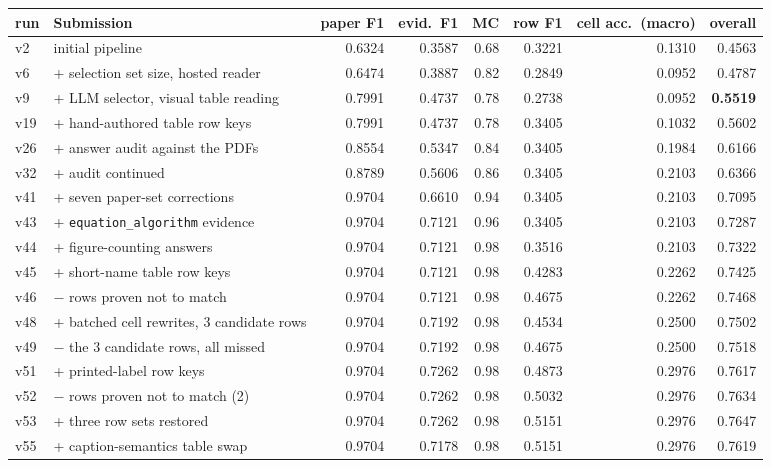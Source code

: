 \documentclass[11pt]{article}
\begin{document}
\begin{table}[t]
\centering\small
\begin{tabular}{llrrrrrr}
\toprule
run & Submission & paper F1 & evid.\ F1 & MC & row F1 & cell acc.\ (macro) & \textbf{overall} \\
\midrule
v2  & initial pipeline                          & 0.6324 & 0.3587 & 0.68 & 0.3221 & 0.1310 & 0.4563 \\
v6  & \;+ selection set size, hosted reader     & 0.6474 & 0.3887 & 0.82 & 0.2849 & 0.0952 & 0.4787 \\
v9  & \;+ LLM selector, visual table reading    & 0.7991 & 0.4737 & 0.78 & 0.2738 & 0.0952 & \textbf{0.5519} \\
v19 & \;+ hand-authored table row keys          & 0.7991 & 0.4737 & 0.78 & 0.3405 & 0.1032 & 0.5602 \\
v26 & \;+ answer audit against the PDFs         & 0.8554 & 0.5347 & 0.84 & 0.3405 & 0.1984 & 0.6166 \\
v32 & \;+ audit continued                       & 0.8789 & 0.5606 & 0.86 & 0.3405 & 0.2103 & 0.6366 \\
v41 & \;+ seven paper-set corrections           & 0.9704 & 0.6610 & 0.94 & 0.3405 & 0.2103 & 0.7095 \\
v43 & \;+ \texttt{equation\_algorithm} evidence & 0.9704 & 0.7121 & 0.96 & 0.3405 & 0.2103 & 0.7287 \\
v44 & \;+ figure-counting answers               & 0.9704 & 0.7121 & 0.98 & 0.3516 & 0.2103 & 0.7322 \\
v45 & \;+ short-name table row keys             & 0.9704 & 0.7121 & 0.98 & 0.4283 & 0.2262 & 0.7425 \\
v46 & \;$-$ rows proven not to match            & 0.9704 & 0.7121 & 0.98 & 0.4675 & 0.2262 & 0.7468 \\
v48 & \;+ batched cell rewrites, 3 candidate rows & 0.9704 & 0.7192 & 0.98 & 0.4534 & 0.2500 & 0.7502 \\
v49 & \;$-$ the 3 candidate rows, all missed    & 0.9704 & 0.7192 & 0.98 & 0.4675 & 0.2500 & 0.7518 \\
v51 & \;+ printed-label row keys                & 0.9704 & 0.7262 & 0.98 & 0.4873 & 0.2976 & 0.7617 \\
v52 & \;$-$ rows proven not to match (2)        & 0.9704 & 0.7262 & 0.98 & 0.5032 & 0.2976 & 0.7634 \\
v53 & \;+ three row sets restored               & 0.9704 & 0.7262 & 0.98 & 0.5151 & 0.2976 & 0.7647 \\
v55 & \;+ caption-semantics table swap          & 0.9704 & 0.7178 & 0.98 & 0.5151 & 0.2976 & 0.7619 \\

\end{tabular}
\end{table}
\end{document}
